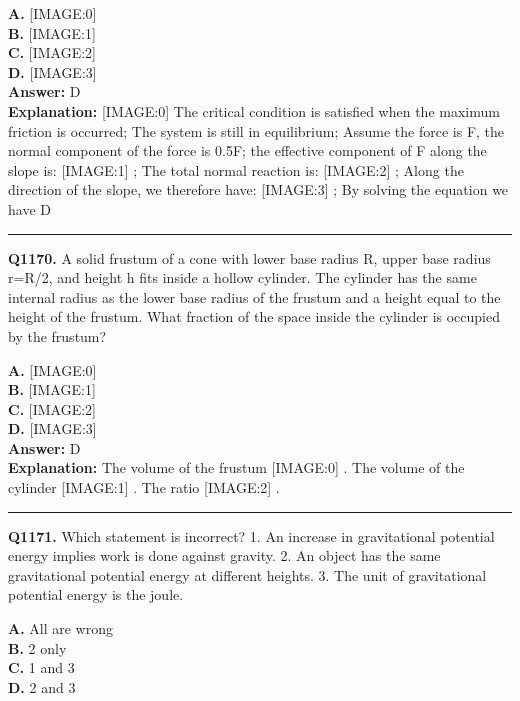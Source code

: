 \documentclass[12pt]{article}
\begin{document}
\textbf{A.} [IMAGE:0] \\
\textbf{B.} [IMAGE:1] \\
\textbf{C.} [IMAGE:2] \\
\textbf{D.} [IMAGE:3] \\

\textbf{Answer:} D \\
\textbf{Explanation:} [IMAGE:0]
The critical condition is satisfied when the maximum friction is occurred; The system is still in equilibrium; Assume the force is F, the normal component of the force is 0.5F; the effective component of F along the slope is:
[IMAGE:1]
; The total normal reaction is:
[IMAGE:2]
; Along the direction of the slope, we therefore have:
[IMAGE:3]
; By solving the equation we have D

\hrule
\vspace{1em}


\noindent
\textbf{Q1170.} A solid frustum of a cone with lower base radius R, upper base radius r=R/2, and height h fits inside a hollow cylinder. The cylinder has the same internal radius as the lower base radius of the frustum and a height equal to the height of the frustum. What fraction of the space inside the cylinder is occupied by the frustum?



\textbf{A.} [IMAGE:0] \\
\textbf{B.} [IMAGE:1] \\
\textbf{C.} [IMAGE:2] \\
\textbf{D.} [IMAGE:3] \\

\textbf{Answer:} D \\
\textbf{Explanation:} The volume of the frustum
[IMAGE:0]
. The volume of the cylinder
[IMAGE:1]
. The ratio
[IMAGE:2]
.

\hrule
\vspace{1em}


\noindent
\textbf{Q1171.} Which statement is incorrect?
1.
An increase in gravitational potential energy implies work is done against gravity.
2.
An object has the same gravitational potential energy at different heights.
3. The unit of gravitational potential energy is the joule.



\textbf{A.} All are wrong \\
\textbf{B.} 2 only \\
\textbf{C.} 1 and 3 \\
\textbf{D.} 2 and 3 \\
\end{document}

